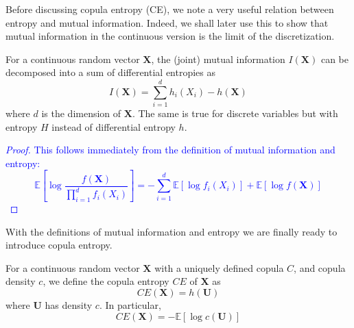 \documentclass[../Thesis.tex]{subfiles}
\begin{document}
Before discussing copula entropy (CE), we note a very useful relation between entropy and mutual information. Indeed, we shall later use this to show that mutual information in the continuous version is the limit of the discretization.
\begin{lemma}\label{lemma:mutual information and entropy relation}
    For a continuous random vector $\boldsymbol{X}$, the (joint) mutual information $I\left(\boldsymbol{X}\right)$ can be decomposed into a sum of differential entropies as
    $$I\left(\boldsymbol{X}\right) = \sum_{i=1}^{d} h_i(X_i) - h\left(\boldsymbol{X}\right)$$
    where $d$ is the dimension of $\boldsymbol{X}$. The same is true for discrete variables but with entropy $H$ instead of differential entropy $h$.
\end{lemma}
\textcolor{blue}{\begin{proof}
        This follows immediately from the definition of mutual information and entropy:
        $$\mathbb{E}\left[\log \frac{f\left(\boldsymbol X\right)}{\prod_{i=1}^d f_i\left(X_i\right)}\right] = - \sum_{i = 1}^d \mathbb{E}\left[\log f_i \left(X_i\right)\right] + \mathbb{E}\left[\log f\left(\boldsymbol X\right) \right] $$
    \end{proof}}
With the definitions of mutual information and entropy we are finally ready to introduce copula entropy.
\begin{definition}\label{def:copula entropy}
    For a continuous random vector $\boldsymbol{X}$ with a uniquely defined copula $C$, and copula density $c$, we define the copula entropy $CE$ of $\boldsymbol{X}$ as
    $$CE\left(\boldsymbol{X}\right) = h\left(\boldsymbol U\right)$$
    where $\boldsymbol U$ has density $c$. In particular,
    $$CE\left(\boldsymbol{X}\right) = - \mathbb{E}\left[\log c \left(\boldsymbol U\right)\right]$$
\end{definition}
\end{document}
